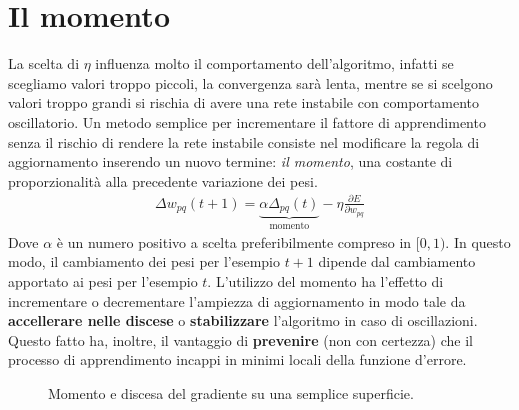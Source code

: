 \newpage


\section{Il momento} %
\label{sub:il_momento}
La scelta di $\eta$ influenza molto il comportamento dell'algoritmo, infatti se scegliamo valori troppo piccoli, la convergenza sarà lenta, mentre se si scelgono valori troppo grandi si rischia di avere una rete instabile con comportamento oscillatorio.
Un metodo semplice per incrementare il fattore di apprendimento senza il rischio di rendere la rete instabile consiste nel modificare la regola di aggiornamento inserendo un nuovo termine: \emph{il momento}, una costante di proporzionalità alla precedente variazione dei pesi.
\begin{align}
    \Delta w_{pq} (t + 1) = \underbrace{\alpha \Delta_{pq} (t)}_\textrm{momento} - \eta \frac{\partial E}{\partial w_{pq}}
\end{align}
Dove $\alpha$ è un numero positivo a scelta preferibilmente compreso in $[0,1)$. In questo modo, il cambiamento dei pesi per l’esempio $t+1$ dipende dal cambiamento apportato ai pesi per l’esempio $t$.
L'utilizzo del momento ha l'effetto di incrementare o decrementare l'ampiezza di aggiornamento in modo tale da \textbf{accellerare nelle discese} o \textbf{stabilizzare} l'algoritmo in caso di oscillazioni. Questo fatto ha, inoltre, il vantaggio di \textbf{prevenire} (non con certezza) che il processo di apprendimento incappi in minimi locali della funzione d'errore.

\begin{figure}[h!]
    \centering
    \qquad
    \caption{Momento e discesa del gradiente su una semplice superficie.}
\end{figure}


